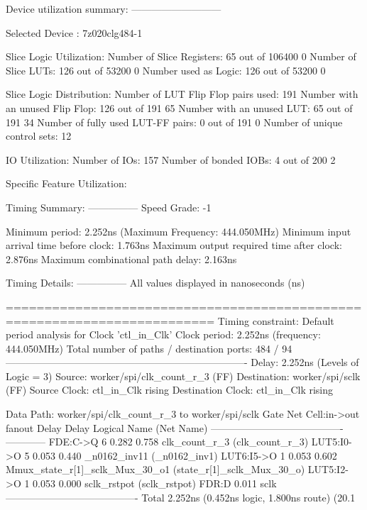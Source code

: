 \documentclass{article}
\begin{document}
Device utilization summary:
---------------------------

Selected Device : 7z020clg484-1 


Slice Logic Utilization: 
 Number of Slice Registers:              65  out of  106400     0%
 Number of Slice LUTs:                  126  out of  53200     0%
    Number used as Logic:               126  out of  53200     0%

Slice Logic Distribution: 
 Number of LUT Flip Flop pairs used:    191
   Number with an unused Flip Flop:     126  out of    191    65%
   Number with an unused LUT:            65  out of    191    34%
   Number of fully used LUT-FF pairs:     0  out of    191     0%
   Number of unique control sets:        12

IO Utilization: 
 Number of IOs:                         157
 Number of bonded IOBs:                   4  out of    200     2%

Specific Feature Utilization:

\fi
\iffalse
Timing Summary:
---------------
Speed Grade: -1

   Minimum period: 2.252ns (Maximum Frequency: 444.050MHz)
   Minimum input arrival time before clock: 1.763ns
   Maximum output required time after clock: 2.876ns
   Maximum combinational path delay: 2.163ns

Timing Details:
---------------
All values displayed in nanoseconds (ns)

=========================================================================
Timing constraint: Default period analysis for Clock 'ctl_in_Clk'
  Clock period: 2.252ns (frequency: 444.050MHz)
  Total number of paths / destination ports: 484 / 94
-------------------------------------------------------------------------
Delay:               2.252ns (Levels of Logic = 3)
  Source:            worker/spi/clk_count_r_3 (FF)
  Destination:       worker/spi/sclk (FF)
  Source Clock:      ctl_in_Clk rising
  Destination Clock: ctl_in_Clk rising

  Data Path: worker/spi/clk_count_r_3 to worker/spi/sclk
                                Gate     Net
    Cell:in->out      fanout   Delay   Delay  Logical Name (Net Name)
    ----------------------------------------  ------------
     FDE:C->Q              6   0.282   0.758  clk_count_r_3 (clk_count_r_3)
     LUT5:I0->O            5   0.053   0.440  _n0162_inv11 (_n0162_inv1)
     LUT6:I5->O            1   0.053   0.602  Mmux_state_r[1]_sclk_Mux_30_o1 (state_r[1]_sclk_Mux_30_o)
     LUT5:I2->O            1   0.053   0.000  sclk_rstpot (sclk_rstpot)
     FDR:D                     0.011          sclk
    ----------------------------------------
    Total                      2.252ns (0.452ns logic, 1.800ns route)
                                       (20.1%
\end{document}
